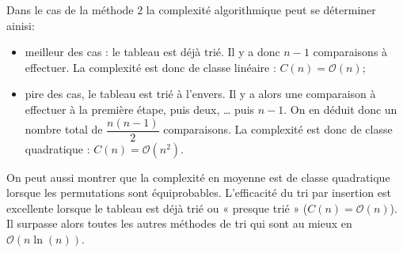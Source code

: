 \documentclass[10pt,fleqn]{article} %
\begin{document}


Dans le cas de la méthode 2 la complexité algorithmique peut se déterminer ainisi: 
\begin{itemize}
\item meilleur des cas : le tableau est déjà trié. Il y a donc $n - 1$ comparaisons à effectuer. La complexité est donc de classe linéaire : $C(n)=\mathcal{O}(n)$;
\item pire des cas, le tableau est trié à l'envers. Il y a alors une comparaison à effectuer à la première étape, puis deux, … puis $n-1$. On en déduit donc un nombre total de $\dfrac{n\left(n-1\right)}{2}$  comparaisons. La complexité est donc de classe quadratique : $C(n)=\mathcal{O}\left(n^2\right)$.

\end{itemize}



\begin{rem}
On peut aussi montrer que la complexité en moyenne est de classe quadratique lorsque les permutations sont équiprobables. L'efficacité du tri par insertion est excellente lorsque le tableau est déjà trié ou « presque trié » ($C(n)=\mathcal{O}\left(n\right)$). Il surpasse alors toutes les autres méthodes de tri qui sont au mieux en $\mathcal{O}\left(n \ln(n)\right)$.
\end{rem}





\end{document}
